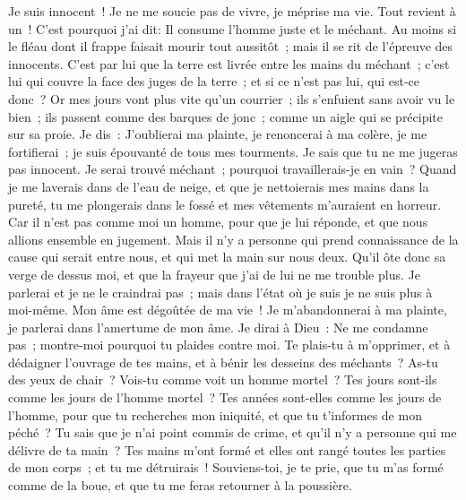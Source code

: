 \begin{multicols}{2}
Je suis innocent~! Je ne me soucie pas de vivre, je méprise ma vie.
Tout revient à un~! C'est pourquoi j'ai dit: Il consume l'homme juste et le méchant.
Au moins si le fléau dont il frappe faisait mourir tout aussitôt~; mais il se rit de l'épreuve des innocents. 
C'est par lui que la terre est livrée entre les mains du méchant~; c'est lui qui couvre la face des juges de la terre~; et si ce n'est pas lui, qui est-ce donc~? 
Or mes jours vont plus vite qu'un courrier~; ils s'enfuient sans avoir vu le bien~;
ils passent comme des barques de jonc~; comme un aigle qui se précipite sur sa proie.
Je dis~: J'oublierai ma plainte, je renoncerai à ma colère, je me fortifierai~; 
je suis épouvanté de tous mes tourments. Je sais que tu ne me jugeras pas innocent.
Je serai trouvé méchant~; pourquoi travaillerais-je en vain~?
Quand je me laverais dans de l'eau de neige, et que je nettoierais mes mains dans la pureté, 
tu me plongerais dans le fossé et mes vêtements m'auraient en horreur.
Car il n'est pas comme moi un homme, pour que je lui réponde, et que nous allions ensemble en jugement.
Mais il n'y a personne qui prend connaissance de la cause qui serait entre nous, et qui met la main sur nous deux.
Qu'il ôte donc sa verge de dessus moi, et que la frayeur que j'ai de lui ne me trouble plus.
Je parlerai et je ne le craindrai pas~; mais dans l'état où je suis je ne suis plus à moi-même. 
\VerseOne{}Mon âme est dégoûtée de ma vie~! Je m'abandonnerai à ma plainte, je parlerai dans l'amertume de mon âme.
Je dirai à Dieu~: Ne me condamne pas~; montre-moi pourquoi tu plaides contre moi.
Te plais-tu à m'opprimer, et à dédaigner l'ouvrage de tes mains, et à bénir les desseins des méchants~?
As-tu des yeux de chair~? Vois-tu comme voit un homme mortel~?
Tes jours sont-ils comme les jours de l'homme mortel~? Tes années sont-elles comme les jours de l'homme, 
pour que tu recherches mon iniquité, et que tu t'informes de mon péché~?
Tu sais que je n'ai point commis de crime, et qu'il n'y a personne qui me délivre de ta main~?
Tes mains m'ont formé et elles ont rangé toutes les parties de mon corps~; et tu me détruirais~!
Souviens-toi, je te prie, que tu m'as formé comme de la boue, et que tu me feras retourner à la poussière. 

\end{multicols}
